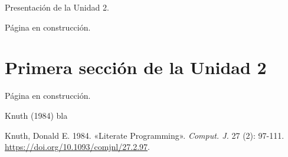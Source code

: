 \documentclass[
  letterpaper,
]{scrbook}
\newlength{\cslhangindent}
\newenvironment{CSLReferences}[2] %
 {\begin{list}{}{%
  \setlength{\itemindent}{0pt}
  \setlength{\leftmargin}{0pt}
  \setlength{\parsep}{0pt}
  \ifodd #1
   \setlength{\leftmargin}{\cslhangindent}
   \setlength{\itemindent}{-1\cslhangindent}
  \fi
  \setlength{\itemsep}{#2\baselineskip}}}
 {\end{list}}
\begin{document}
\thispagestyle{primerapagina}

Presentación de la Unidad 2.

Página en construcción.

\chapter{Primera sección de la Unidad
2}\label{primera-secciuxf3n-de-la-unidad-2}

\thispagestyle{primerapagina}

Página en construcción.

Knuth (1984) bla

\label{refs}
\begin{CSLReferences}{1}{0}
Knuth, Donald E. 1984. {«Literate Programming»}. \emph{Comput. J.} 27
(2): 97-111. \url{https://doi.org/10.1093/comjnl/27.2.97}.

\end{CSLReferences}


\backmatter
\end{document}
